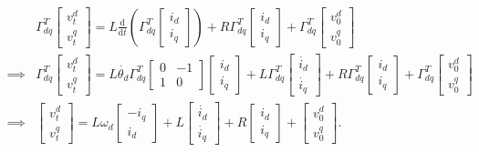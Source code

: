 \begin{align*}
	&\Gamma_{dq}^T \begin{bmatrix}
		v_t^d\\v_t^q
	\end{bmatrix} = L\frac{\text{d}}{\text{d}t}\left(\Gamma_{dq}^T\begin{bmatrix}
		i_d\\i_q
	\end{bmatrix}\right)+R\Gamma_{dq}^T\begin{bmatrix}
		i_d\\i_q
	\end{bmatrix}+\Gamma_{dq}^T\begin{bmatrix}
		v_0^d\\v_0^q
	\end{bmatrix}\\
	\implies & \Gamma_{dq}^T\begin{bmatrix}
		v_t^d\\v_t^q
	\end{bmatrix} = L\dot{\theta_d}\Gamma_{dq}^T\begin{bmatrix}
		0 & -1\\1 & 0
	\end{bmatrix}\begin{bmatrix}
		i_d\\i_q
	\end{bmatrix}+L\Gamma_{dq}^T\begin{bmatrix}
		\dot{i_d}\\\dot{i_q}
	\end{bmatrix}+R\Gamma_{dq}^T\begin{bmatrix}
		i_d\\i_q
	\end{bmatrix}+\Gamma_{dq}^T\begin{bmatrix}
		v_0^d\\v_0^q
	\end{bmatrix}\\
	\implies & \begin{bmatrix}
		v_t^d\\v_t^q
	\end{bmatrix} = L\omega_d\begin{bmatrix}
		-i_q\\i_d
	\end{bmatrix}+L\begin{bmatrix}
		\dot{i_d}\\\dot{i_q}
	\end{bmatrix}+R\begin{bmatrix}
		i_d\\i_q
	\end{bmatrix}+\begin{bmatrix}
		v_0^d\\v_0^q
	\end{bmatrix}.
\end{align*}
